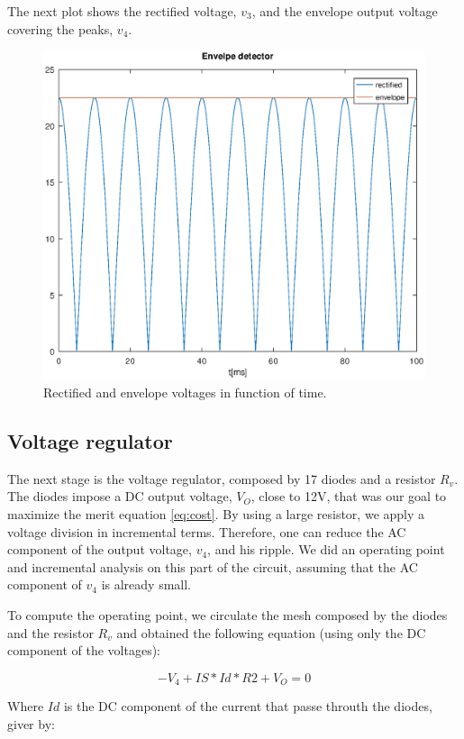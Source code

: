 The next plot shows the rectified voltage, $v_3$, and the envelope output voltage covering the peaks, $v_4$. 

\begin{figure}[H] \centering
\includegraphics[clip, trim=1.3cm 1.3cm 0cm 7cm, width=0.6\linewidth]{venvlope.eps}
\caption{Rectified and envelope voltages in function of time.}
\label{fig:env}
\end{figure}

\subsection{Voltage regulator}
\label{subsec:reg}

\par The next stage is the voltage regulator, composed by 17 diodes and a resistor $R_v$. The diodes impose a DC output voltage, $V_O$, close to 12V, that was our goal to maximize the merit equation \ref{eq:cost}. By using a large resistor, we apply a voltage division in incremental terms. Therefore, one can reduce the AC component of the output voltage, $v_4$, and his ripple. We did an operating point and incremental analysis on this part of the circuit, assuming that the AC component of $v_4$ is already small.

\par To compute the operating point, we circulate the mesh composed by the diodes and the resistor $R_v$ and obtained the following equation (using only the DC component of the voltages):

\begin{equation}
 -V_4+IS*Id*R2+V_O=0
  \label{eq:reg_mesh}
\end{equation}
 
 \par Where $Id$ is the DC component of the current that passe throuth the diodes, giver by:
 
